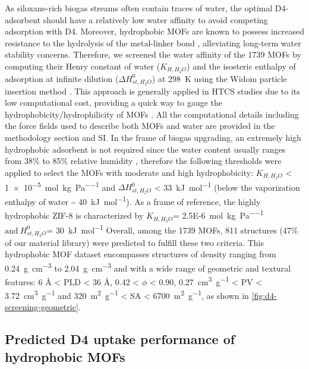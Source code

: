 As siloxane-rich biogas streams often contain traces of water, the optimal
D4-adsorbent should have a relatively low water affinity to avoid competing
adsorption with D4. Moreover, hydrophobic MOFs are known to possess increased
resistance to the hydrolysis of the metal-linker bond
\citep{burtchWaterStabilityAdsorption2014,
wuEnhancingStabilityMetalorganic2010}, alleviating long-term water stability
concerns. Therefore, we screened the water affinity of the 1739 MOFs by
computing their Henry constant of water (\(K_{H,H_{2}O}\)) and the isosteric
enthalpy of adsorption at infinite dilution (\(\Delta H_{st,H_{2}O}^{0}\)) at
\SI{298}{\kelvin} using the Widom particle insertion method
\citep{frenkelUnderstandingMolecularSimulation2002}. This approach is generally
applied in HTCS studies due to its low computational cost, providing a quick way
to gauge the hydrophobicity/hydrophilicity of MOFs
\citep{matito-martosDiscoveryOptimalPorous2018,
qiaoHighthroughputComputationalScreening2017}. All the computational details
including the force fields used to describe both MOFs and water are provided in
the methodology section and SI. In the frame of biogas upgrading, an extremely
high hydrophobic adsorbent is not required since the water content usually
ranges from 38\% to 85\% relative humidity
\citep{wangRecentAdvancesTechnologies2019}, therefore the following thresholds
were applied to select the MOFs with moderate and high hydrophobicity:
\(K_{H,H_{2}O}\) < \SI{1e-5}{\mol\per\kilo\gram\per\pascal} and
\(\Delta H_{st,H_{2}O}^{0}\) < \SI{33}{\kilo\joule\per\mol} (below the vaporization
enthalpy of water \textasciitilde
\SI{40}{\kilo\joule\per\mol}).\citep{lemmonNISTStandardReference2018} As a frame
of reference, the highly hydrophobic ZIF-8 is characterized by \(K_{H,H_{2}O}\)=
\SI{2.5E-6}{\mol\per\kilo\gram\per\pascal} \(\text{and}\ H_{st,H_{2}O}^{0}\)=
\SI{30}{\kilo\joule\per\mol}
\citep{moghadamEfficientIdentificationHydrophobic2016} Overall, among the 1739
MOFs, 811 structures (47\% of our material library) were predicted to fulfill
these two criteria. This hydrophobic MOF dataset encompasses structures of
density ranging from \SI{0.24}{\gram\per\centi\metre\cubed} to
\SI{2.04}{\gram\per\centi\metre\cubed} and with a wide range of geometric and
textural features: 6 Å < PLD < 36 Å, 0.42 < \(\phi\) < 0.90,
\SI{0.27}{\centi\metre\cubed\per\gram} < PV <
\SI{3.72}{\centi\metre\cubed\per\gram} and \SI{320}{\metre\squared\per\gram} <
SA < \SI{6700}{\metre\squared\per\gram}, as shown in \cref{fig:d4-screening-geometric}.

\subsection{Predicted D4 uptake performance of hydrophobic MOFs}\label{d4-screening}

